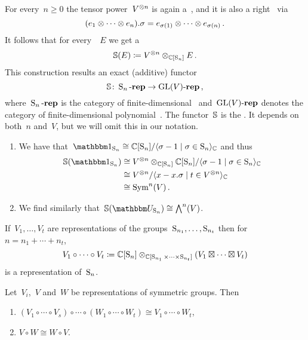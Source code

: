 \documentclass[a4paper,10pt]{scrartcl}
\begin{document}
For every~$n \geq 0$ the tensor power~$V^{\otimes n}$ is again a~{}, and it is also a right~{} via
\[
  (e_1 \otimes \dotsb \otimes e_n) . \sigma
  =
  e_{\sigma(1)} \otimes \dotsb \otimes e_{\sigma(n)} \,.
\]
It follows that for every~{}~$E$ we get a~{}
\[
  \mathbb{S}(E)
  \coloneqq
  V^{\otimes n} \otimes_{\mathbb{C}[\operatorname{S}_n]} E \,.
\]
This construction results an exact (additive) functor
\[
  \mathbb{S}
  \colon
  \operatorname{S}_n\text{-}\mathbf{rep}
  \to
  \operatorname{GL}(V)\text{-}\mathbf{rep} \,,
\]
where~$\operatorname{S}_n\text{-}\mathbf{rep}$ is the category of finite-dimensional~{} and~$\operatorname{GL}(V)\text{-}\mathbf{rep}$ denotes the category of finite-dimensional polynomial~{}. 
The functor~$\mathbb{S}$ is the .
It depends on both~$n$ and~$V$, but we will omit this in our notation.

\begin{example}
  \leavevmode
  \begin{enumerate}
    \item
      We have that~$\trivrep_{\symm_n} \cong \Complex[\symm_n]/\gen{\sigma - 1 \suchthat \sigma \in \symm_n}_{\Complex}$ and thus
      \begin{align*}
        \Schur( \trivrep_{\symm_n} )
        &\cong
        V^{\tensor n} \tensor_{\Complex[\symm_n]} \Complex[\symm_n]/\gen{\sigma - 1 \suchthat \sigma \in \symm_n}_{\Complex}
        \\
        &\cong
        V^{\tensor n}/\gen{x - x.\sigma \suchthat t \in V^{\tensor n}}_{\Complex}
        \\
        &\cong
        \Symm^n(V) \,.
      \end{align*}
    \item
      We find similarly that~$\Schur( \signrep_{\symm_n} ) \cong \Exterior^n(V)$.
  \end{enumerate}
\end{example}

If~$V_1, \dotsc, V_t$ are representations of the groups~$\operatorname{S}_{n_1}, \dotsc, \operatorname{S}_{n_t}$ then for~$n = n_1 + \dotsb + n_t$,
\[
  V_1 \circ \dotsb \circ V_t
  \coloneqq
  \mathbb{C}[\operatorname{S}_n]
  \otimes_{\mathbb{C}[\operatorname{S}_{n_1} \times \dotsb \times \operatorname{S}_{n_t}]}
  (V_1 \boxtimes \dotsb \boxtimes V_t)
\]
is a representation of~$\operatorname{S}_n$.

\begin{lemma}
  \label{properties of circle product}
  Let~$V_i$,~$V$ and~$W$ be representations of symmetric groups.
  Then
  \begin{enumerate}
    \item
      $(V_1 \circ \dotsb \circ V_s) \circ \dotsb \circ (W_1 \circ \dotsb \circ W_t) \cong V_1 \circ \dotsb \circ W_t$,
    \item
      $V \circ W \cong W \circ V$.
  \end{enumerate}
\end{lemma}
\end{document}
